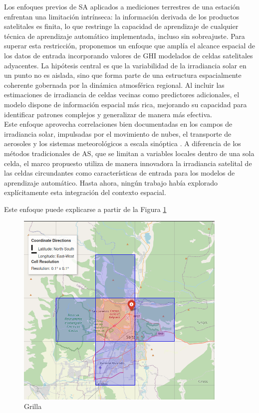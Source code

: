 Los enfoques previos de SA aplicados a mediciones terrestres de una estación enfrentan una limitación intrínseca: la información derivada de los productos satelitales es finita, lo que restringe la capacidad de aprendizaje de cualquier técnica de aprendizaje automático implementada, incluso sin sobreajuste. Para superar esta restricción, proponemos un enfoque que amplía el alcance espacial de los datos de entrada incorporando valores de GHI modelados de celdas satelitales adyacentes. La hipótesis central es que la variabilidad de la irradiancia solar en un punto no es aislada, sino que forma parte de una estructura espacialmente coherente gobernada por la dinámica atmosférica regional. Al incluir las estimaciones de irradiancia de celdas vecinas como predictores adicionales, el modelo dispone de información espacial más rica, mejorando su capacidad para identificar patrones complejos y generalizar de manera más efectiva.\\

Este enfoque aprovecha correlaciones bien documentadas en los campos de irradiancia solar, impulsadas por el movimiento de nubes, el transporte de aerosoles y los sistemas meteorológicos a escala sinóptica \citep{IHSAN2024}. A diferencia de los métodos tradicionales de AS, que se limitan a variables locales dentro de una sola celda, el marco propuesto utiliza de manera innovadora la irradiancia satelital de las celdas circundantes como características de entrada para los modelos de aprendizaje automático. Hasta ahora, ningún trabajo había explorado explícitamente esta integración del contexto espacial.



Este enfoque puede explicarse a partir de la Figura \ref{fig:gridSA}



\begin{figure}
    \centering
    \includegraphics[width=0.9\textwidth]{figuras/gridSA.png}
    \caption{Grilla }
    \label{fig:gridSA}
\end{figure}


